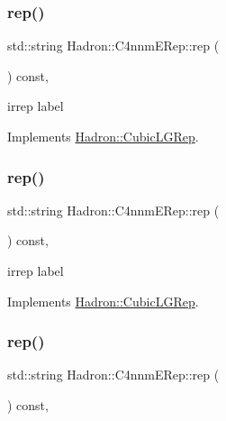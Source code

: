 \subsubsection{\texorpdfstring{rep()}{rep()}\hspace{0.1cm}{\footnotesize\ttfamily [1/3]}}
{\footnotesize\ttfamily std\+::string Hadron\+::\+C4nnm\+E\+Rep\+::rep (\begin{DoxyParamCaption}{ }\end{DoxyParamCaption}) const\hspace{0.3cm}{\ttfamily [inline]}, {\ttfamily [virtual]}}

irrep label 

Implements \mbox{\hyperlink{structHadron_1_1CubicLGRep_a50f5ddbb8f4be4cee0106fa9e8c75e6c}{Hadron\+::\+Cubic\+L\+G\+Rep}}.

\mbox{\label{structHadron_1_1C4nnmERep_af7b1046412f5b815c19810b47eb8686d}} 
\subsubsection{\texorpdfstring{rep()}{rep()}\hspace{0.1cm}{\footnotesize\ttfamily [2/3]}}
{\footnotesize\ttfamily std\+::string Hadron\+::\+C4nnm\+E\+Rep\+::rep (\begin{DoxyParamCaption}{ }\end{DoxyParamCaption}) const\hspace{0.3cm}{\ttfamily [inline]}, {\ttfamily [virtual]}}

irrep label 

Implements \mbox{\hyperlink{structHadron_1_1CubicLGRep_a50f5ddbb8f4be4cee0106fa9e8c75e6c}{Hadron\+::\+Cubic\+L\+G\+Rep}}.

\mbox{\label{structHadron_1_1C4nnmERep_af7b1046412f5b815c19810b47eb8686d}} 
\subsubsection{\texorpdfstring{rep()}{rep()}\hspace{0.1cm}{\footnotesize\ttfamily [3/3]}}
{\footnotesize\ttfamily std\+::string Hadron\+::\+C4nnm\+E\+Rep\+::rep (\begin{DoxyParamCaption}{ }\end{DoxyParamCaption}) const\hspace{0.3cm}{\ttfamily [inline]}, {\ttfamily [virtual]}}

